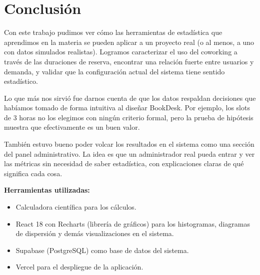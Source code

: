 \documentclass[12pt,a4paper]{article}
\begin{document}
\section*{Conclusión}

Con este trabajo pudimos ver cómo las herramientas de estadística que aprendimos en la materia se pueden aplicar a un proyecto real (o al menos, a uno con datos simulados realistas). Logramos caracterizar el uso del coworking a través de las duraciones de reserva, encontrar una relación fuerte entre usuarios y demanda, y validar que la configuración actual del sistema tiene sentido estadístico.

Lo que más nos sirvió fue darnos cuenta de que los datos respaldan decisiones que habíamos tomado de forma intuitiva al diseñar BookDesk. Por ejemplo, los slots de 3 horas no los elegimos con ningún criterio formal, pero la prueba de hipótesis muestra que efectivamente es un buen valor.

También estuvo bueno poder volcar los resultados en el sistema como una sección del panel administrativo. La idea es que un administrador real pueda entrar y ver las métricas sin necesidad de saber estadística, con explicaciones claras de qué significa cada cosa.

\vspace{1cm}
\noindent\textbf{Herramientas utilizadas:}
\begin{itemize}[itemsep=4pt]
  \item Calculadora científica para los cálculos.
  \item React 18 con Recharts (librería de gráficos) para los histogramas, diagramas de dispersión y demás visualizaciones en el sistema.
  \item Supabase (PostgreSQL) como base de datos del sistema.
  \item Vercel para el despliegue de la aplicación.
\end{itemize}
\end{document}
